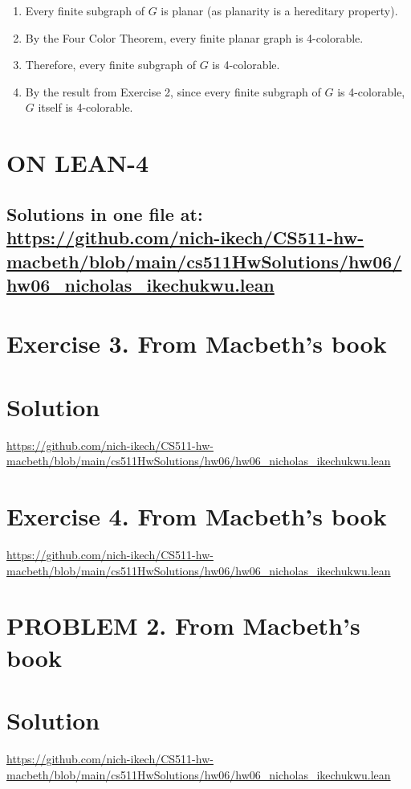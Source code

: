 \documentclass{article}
\newenvironment{proof}
{\begin{mdframed}[linewidth=0.5pt]\begin{enumerate}[label=\arabic*.,leftmargin=*]}
{\end{enumerate}\end{mdframed}}
\begin{document}
\begin{proof}
    
    \item Every finite subgraph of $G$ is planar (as planarity is a hereditary property).
    
    \item By the Four Color Theorem, every finite planar graph is 4-colorable.
    
    \item Therefore, every finite subgraph of $G$ is 4-colorable.
    
    \item By the result from Exercise 2, since every finite subgraph of $G$ is 4-colorable, $G$ itself is 4-colorable.
    
    
    \end{proof}

\newpage







\section*{ON LEAN-4}
\subsection*{Solutions in one file at: 
\url{https://github.com/nich-ikech/CS511-hw-macbeth/blob/main/cs511HwSolutions/hw06/hw06_nicholas_ikechukwu.lean}}

\newpage

\section*{Exercise 3. From Macbeth's book}
\section*{Solution}
\url{https://github.com/nich-ikech/CS511-hw-macbeth/blob/main/cs511HwSolutions/hw06/hw06_nicholas_ikechukwu.lean}

\newpage

\section*{Exercise 4. From Macbeth's book}

\url{https://github.com/nich-ikech/CS511-hw-macbeth/blob/main/cs511HwSolutions/hw06/hw06_nicholas_ikechukwu.lean}

\newpage

\section*{PROBLEM 2. From Macbeth's book}
\section*{Solution}

\url{https://github.com/nich-ikech/CS511-hw-macbeth/blob/main/cs511HwSolutions/hw06/hw06_nicholas_ikechukwu.lean}
\end{document}
